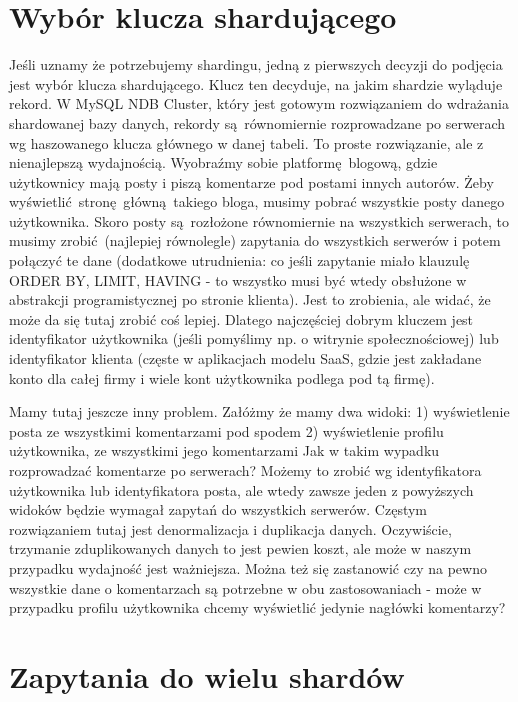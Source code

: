 \documentclass[a4paper,12pt]{article}
\begin{document}
\section{Wybór klucza shardującego}

Jeśli uznamy że potrzebujemy shardingu, jedną z pierwszych decyzji do podjęcia jest wybór klucza shardującego. Klucz ten decyduje, na jakim shardzie wyląduje rekord. W MySQL NDB Cluster, który jest gotowym rozwiązaniem do wdrażania shardowanej bazy danych, rekordy są równomiernie rozprowadzane po serwerach wg haszowanego klucza głównego w danej tabeli. To proste rozwiązanie, ale z nienajlepszą wydajnością. Wyobraźmy sobie platformę blogową, gdzie użytkownicy mają posty i piszą komentarze pod postami innych autorów. Żeby wyświetlić stronę główną takiego bloga, musimy pobrać wszystkie posty danego użytkownika. Skoro posty są rozłożone równomiernie na wszystkich serwerach, to musimy zrobić (najlepiej równolegle) zapytania do wszystkich serwerów i potem połączyć te dane (dodatkowe utrudnienia: co jeśli zapytanie miało klauzulę ORDER BY, LIMIT, HAVING - to wszystko musi być wtedy obsłużone w abstrakcji programistycznej po stronie klienta). Jest to zrobienia, ale widać, że może da się tutaj zrobić coś lepiej. Dlatego najczęściej dobrym kluczem jest identyfikator użytkownika (jeśli pomyślimy np. o witrynie społecznościowej) lub identyfikator klienta (częste w aplikacjach modelu SaaS, gdzie jest zakładane konto dla całej firmy i wiele kont użytkownika podlega pod tą firmę).

Mamy tutaj jeszcze inny problem. Załóżmy że mamy dwa widoki:
1) wyświetlenie posta ze wszystkimi komentarzami pod spodem
2) wyświetlenie profilu użytkownika, ze wszystkimi jego komentarzami
Jak w takim wypadku rozprowadzać komentarze po serwerach? Możemy to zrobić wg identyfikatora użytkownika lub identyfikatora posta, ale wtedy zawsze jeden z powyższych widoków będzie wymagał zapytań do wszystkich serwerów. Częstym rozwiązaniem tutaj jest denormalizacja i duplikacja danych. Oczywiście, trzymanie zduplikowanych danych to jest pewien koszt, ale może w naszym przypadku wydajność jest ważniejsza. Można też się zastanowić czy na pewno wszystkie dane o komentarzach są potrzebne w obu zastosowaniach - może w przypadku profilu użytkownika chcemy wyświetlić jedynie nagłówki komentarzy?

\section{Zapytania do wielu shardów}
\end{document}
